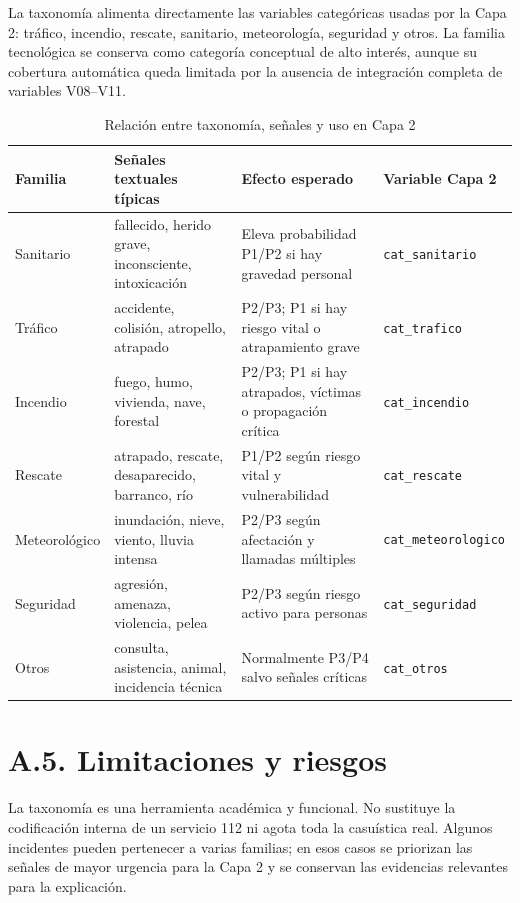 La taxonomía alimenta directamente las variables categóricas usadas por la Capa 2:
tráfico, incendio, rescate, sanitario, meteorología, seguridad y otros. La familia tecnológica se conserva como categoría conceptual de
alto interés, aunque su cobertura automática queda limitada por la ausencia de
integración completa de variables V08--V11.

\begin{table}[ht]
\centering
\caption{Relación entre taxonomía, señales y uso en Capa 2}
\label{tab:anexoa-senales}
\scriptsize
\begin{tabularx}{\textwidth}{|p{2.3cm}|p{4.0cm}|X|p{2.5cm}|}
\hline
\textbf{Familia} & \textbf{Señales textuales típicas} & \textbf{Efecto esperado} & \textbf{Variable Capa 2} \\ \hline
Sanitario & fallecido, herido grave, inconsciente, intoxicación & Eleva probabilidad P1/P2 si hay gravedad personal & \texttt{cat\_sanitario} \\ \hline
Tráfico & accidente, colisión, atropello, atrapado & P2/P3; P1 si hay riesgo vital o atrapamiento grave & \texttt{cat\_trafico} \\ \hline
Incendio & fuego, humo, vivienda, nave, forestal & P2/P3; P1 si hay atrapados, víctimas o propagación crítica & \texttt{cat\_incendio} \\ \hline
Rescate & atrapado, rescate, desaparecido, barranco, río & P1/P2 según riesgo vital y vulnerabilidad & \texttt{cat\_rescate} \\ \hline
Meteorológico & inundación, nieve, viento, lluvia intensa & P2/P3 según afectación y llamadas múltiples & \texttt{cat\_meteorologico} \\ \hline
Seguridad & agresión, amenaza, violencia, pelea & P2/P3 según riesgo activo para personas & \texttt{cat\_seguridad} \\ \hline
Otros & consulta, asistencia, animal, incidencia técnica & Normalmente P3/P4 salvo señales críticas & \texttt{cat\_otros} \\ \hline
\end{tabularx}
\end{table}

\section*{A.5. Limitaciones y riesgos}

La taxonomía es una herramienta académica y funcional. No sustituye la codificación
interna de un servicio 112 ni agota toda la casuística real. Algunos incidentes pueden
pertenecer a varias familias; en esos casos se priorizan las señales de mayor urgencia
para la Capa 2 y se conservan las evidencias relevantes para la explicación.

